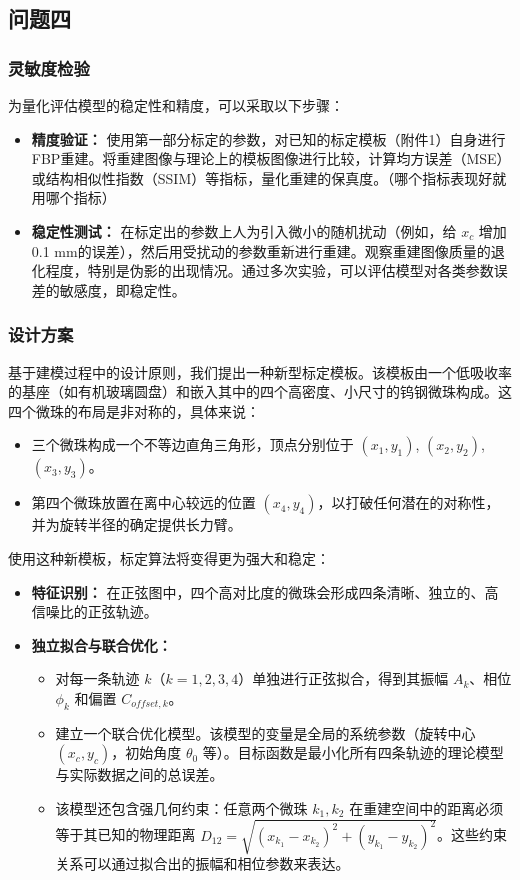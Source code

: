 \subsection{问题四}
\subsubsection{灵敏度检验}
为量化评估模型的稳定性和精度，可以采取以下步骤：
\begin{itemize}
    \item \textbf{精度验证：} 使用第一部分标定的参数，对已知的标定模板（附件1）自身进行FBP重建。将重建图像与理论上的模板图像进行比较，计算均方误差（MSE）或结构相似性指数（SSIM）等指标，量化重建的保真度。（哪个指标表现好就用哪个指标）  
    \item \textbf{稳定性测试：} 在标定出的参数上人为引入微小的随机扰动（例如，给 $x_c$ 增加0.1 mm的误差），然后用受扰动的参数重新进行重建。观察重建图像质量的退化程度，特别是伪影的出现情况。通过多次实验，可以评估模型对各类参数误差的敏感度，即稳定性。
\end{itemize}


\subsubsection{设计方案}  
基于建模过程中的设计原则，我们提出一种新型标定模板。该模板由一个低吸收率的基座（如有机玻璃圆盘）和嵌入其中的四个高密度、小尺寸的钨钢微珠构成。这四个微珠的布局是非对称的，具体来说：
\begin{itemize}
    \item 三个微珠构成一个不等边直角三角形，顶点分别位于 $(x_1,y_1)$, $(x_2,y_2)$, $(x_3,y_3)$。  
    \item 第四个微珠放置在离中心较远的位置 $(x_4,y_4)$，以打破任何潜在的对称性，并为旋转半径的确定提供长力臂。
\end{itemize}
使用这种新模板，标定算法将变得更为强大和稳定：
\begin{itemize}
    \item \textbf{特征识别：} 在正弦图中，四个高对比度的微珠会形成四条清晰、独立的、高信噪比的正弦轨迹。  
    \item \textbf{独立拟合与联合优化：}  
    \begin{itemize}
        \item 对每一条轨迹 $k$（$k=1,2,3,4$）单独进行正弦拟合，得到其振幅 $A_k$、相位 $\phi_k$ 和偏置 $C_{offset,k}$。  
        \item 建立一个联合优化模型。该模型的变量是全局的系统参数（旋转中心 $(x_c,y_c)$，初始角度 $\theta_0$ 等）。目标函数是最小化所有四条轨迹的理论模型与实际数据之间的总误差。  
        \item 该模型还包含强几何约束：任意两个微珠 $k_1,k_2$ 在重建空间中的距离必须等于其已知的物理距离 $D_{12}=\sqrt{(x_{k_1}-x_{k_2})^2+(y_{k_1}-y_{k_2})^2}$。这些约束关系可以通过拟合出的振幅和相位参数来表达。  
    \end{itemize}
\end{itemize}